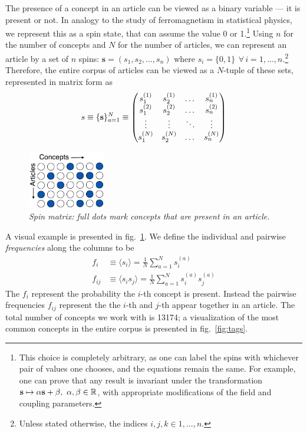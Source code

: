 \documentclass[a4paper,12pt,twoside]{article}
\def \be {\begin{equation}}
\def \ee {\end{equation}}
\def \bf {\textbf}
\begin{document}
The presence of a concept in an article can be viewed as a binary variable --- it is present or not.
In analogy to the study of ferromagnetism in statistical physics, we represent this as a spin state, that can assume the value 0 or 1.\footnote{This choice is completely arbitrary, as one can label the spins with whichever pair of values one chooses, and the equations remain the same. For example, one can prove that any result is invariant under the transformation $\bf s \mapsto \alpha \bf s + \beta,~\alpha,\beta \in \mathbb{R}$, with appropriate modifications of the field and coupling parameters.}
Using $n$ for the number of concepts and $N$ for the number of articles, we can represent an article by a set of $n$ spins: $\bf{s}=(s_1,s_2,\dots,s_n)$ where $s_i = \{0,1\}\,~\forall\,i=1,\dots,n$.\footnote{Unless stated otherwise, the indices $i,j,k \in 1,\dots,n$.} Therefore, the entire corpus of articles can be viewed as a $N$-tuple of these sets, represented in matrix form as
\be
s\equiv \{\bf s\}_{a=1}^N \equiv
  \begin{pmatrix}
  s_1^{(1)}  & s_2^{(1)} & \dots  & s_n^{(1)}  \\
  s_1^{(2)}  & s_2^{(2)} & \dots  & s_n^{(2)}  \\
  \vdots  & \vdots & \ddots  & \vdots \\
  s_1^{(N)}  & s_2^{(N)} & \dots  & s_n^{(N)}  \\
  \end{pmatrix}
  \label{eq:smatrix}
\ee
\begin{figure}
  \centerline{\includegraphics[width=0.3\textwidth]{../img/dots.png}}
  \caption{\em Spin matrix: full dots mark concepts that are present in an article.}
  \label{fig:dots}
\end{figure}

A visual example is presented in fig.~\ref{fig:dots}.
We define the individual and pairwise {\em frequencies} along the columns to be
\begin{subequations}
  \begin{align}
    f_i &\equiv \langle s_i \rangle = \frac{1}{N} \sum_{a=1}^N s_i^{(a)} \\
    f_{ij} &\equiv \langle s_i s_j \rangle = \frac{1}{N} \sum_{a=1}^N s_i^{(a)}s_j^{(a)}
  \end{align}
  \label{eq:fdef}
\end{subequations}
The $f_{i}$ represent the probability the $i$-th concept is present. 
Instead the pairwise frequencies $f_{ij}$ represent the the $i$-th and $j$-th appear together in an article.
The total number of concepts we work with is 13174; a visualization of the most common concepts in the entire corpus is presented in fig.~\ref{fig:tags}.
\end{document}
